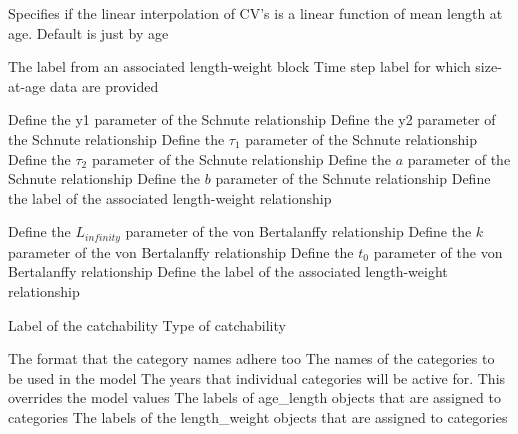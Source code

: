  {Specifies if the linear interpolation of CV's is a linear function of mean length at age. Default is just by age}
\par\textbf{}\par
{} {}
 {}
 {The label from an associated length-weight block}
 {Time step label for which size-at-age data are provided}
\par\textbf{}\par
\par\textbf{}\par
{} {Define the y1 parameter of the Schnute relationship}
 {Define the y2 parameter of the Schnute relationship}
 {Define the $\tau_1$ parameter of the Schnute relationship}
 {Define the $\tau_2$ parameter of the Schnute relationship}
 {Define the $a$ parameter of the Schnute relationship}
 {Define the $b$ parameter of the Schnute relationship}
 {Define the label of the associated length-weight relationship}
\par\textbf{}\par
{} {Define the $L_{infinity}$ parameter of the von Bertalanffy relationship}
 {Define the $k$ parameter of the von Bertalanffy relationship}
 {Define the $t_0$ parameter of the von Bertalanffy relationship}
 {Define the label of the associated length-weight relationship}
\par\par
{} {Label of the catchability}
 {Type of catchability}
\par\par
{} {The format that the category names adhere too}
 {The names of the categories to be used in the model}
 {The years that individual categories will be active for. This overrides the model values}
 {The labels of age\_length objects that are assigned to categories}
 {The labels of the length\_weight objects that are assigned to categories}
